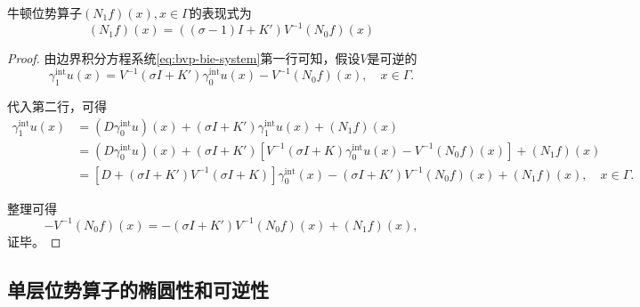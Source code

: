 \begin{lemma}[牛顿位势算子与其他算子的关系]
  \label{lemma:bvp-bie-relation-newton-potential}
牛顿位势算子$\left( N_{1} f \right)(x), x \in \Gamma$的表现式为
\begin{equation}
  \label{eq:bvp-bie-relation-newton-potential}
  \left(N_{1} f \right)(x) =
  \left( (\sigma - 1) I + K' \right)
  V^{-1}
  \left( N_{0} f \right)(x)
\end{equation}
\end{lemma}
\begin{proof}
  由边界积分方程系统\eqref{eq:bvp-bie-system}第一行可知，假设$V$是可逆的
  \begin{equation*}
    \gamma_{1}^{\text{int}} u(x) =
    V^{-1} \left( \sigma I + K' \right) \gamma_{0}^{\text{int}} u(x)
    - V^{-1} \left( N_{0} f \right)(x), \quad x \in \Gamma.
  \end{equation*}

  代入第二行，可得
  \begin{equation*}
    \begin{split}
      \gamma_{1}^{\text{int}} u(x) &=
      \left(D \gamma_{0}^{\text{int}} u \right)(x)
      + \left( \sigma I + K' \right) \gamma_{1}^{\text{int}} u(x)
      + \left( N_{1} f \right)(x) \\
      & =
      \left(D \gamma_{0}^{\text{int}} u \right)(x)
      + \left( \sigma I + K' \right)
      \left[
      V^{-1} \left( \sigma I + K \right) \gamma_{0}^{\text{int}} u(x)
      - V^{-1} \left( N_{0} f \right)(x)
      \right]
      + \left( N_{1} f \right)(x) \\
      & =
      \left[ D +
      \left( \sigma I + K' \right)
      V^{-1} \left( \sigma I + K \right)
      \right]
      \gamma_{0}^{\text{int}} (x)
      - \left( \sigma I + K' \right)
      V^{-1} \left( N_{0} f \right)(x)
      + \left( N_{1} f \right)(x), \quad x \in \Gamma.
    \end{split}
  \end{equation*}

  整理可得
  \begin{equation*}
    - V^{-1} \left( N_{0} f \right)(x)
    = - \left( \sigma I + K' \right) V^{-1} \left( N_{0} f \right)(x) + \left( N_{1} f \right)(x),
    \end{equation*}
证毕。
\end{proof}

\subsection{单层位势算子的椭圆性和可逆性}
\label{sec:bvp-single-layer-ellipticity}

